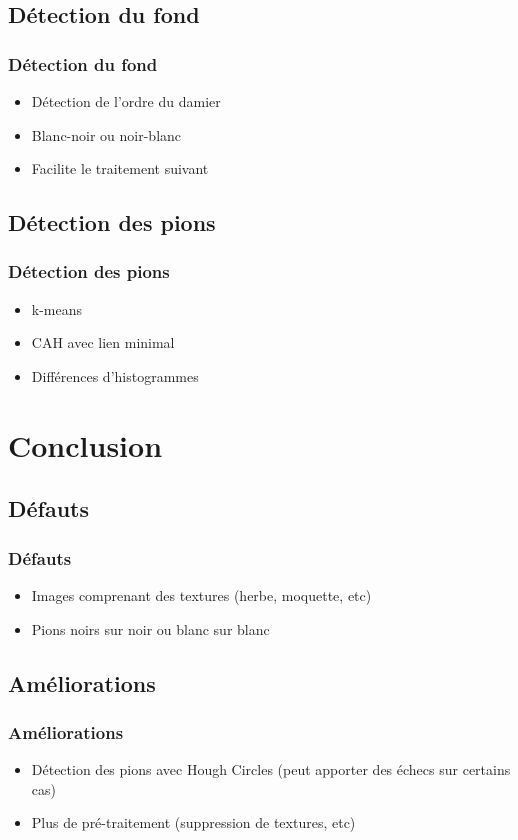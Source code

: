 \documentclass{beamer}
\begin{document}
    \subsection{Détection du fond}
    \begin{frame}
      \frametitle{Détection du fond}
      \begin{itemize}
      \item Détection de l'ordre du damier
      \item Blanc-noir ou noir-blanc
      \item Facilite le traitement suivant
      \end{itemize}
    \end{frame}
    \subsection{Détection des pions}
    \begin{frame}
      \frametitle{Détection des pions}
      \begin{itemize}
      \item k-means
      \item CAH avec lien minimal
      \item Différences d'histogrammes
      \end{itemize}
    \end{frame}
    \section{Conclusion}
    \subsection{Défauts}
    \begin{frame}
      \frametitle{Défauts}
      \begin{itemize}
      \item Images comprenant des textures (herbe, moquette, etc)
      \item Pions noirs sur noir ou blanc sur blanc
      \end{itemize}
    \end{frame}
    \subsection{Améliorations}
    \begin{frame}
      \frametitle{Améliorations}
      \begin{itemize}
      \item Détection des pions avec Hough Circles (peut apporter des échecs sur certains cas)
      \item Plus de pré-traitement (suppression de textures, etc)
      \end{itemize}
    \end{frame}
  
\end{document}
